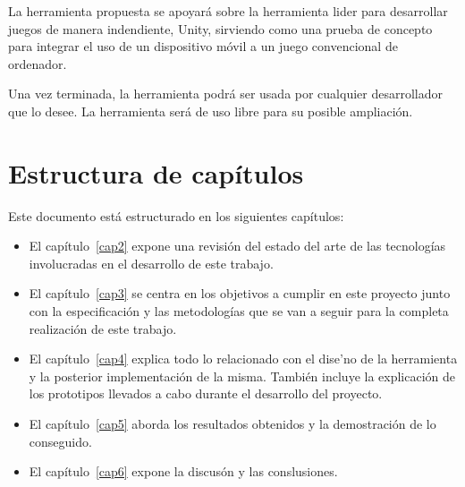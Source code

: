 La herramienta propuesta se apoyar\'a sobre la herramienta lider para desarrollar juegos de manera indendiente, Unity, sirviendo como una prueba de concepto para integrar el uso de un dispositivo m\'ovil a un juego convencional de ordenador.

Una vez terminada,  la herramienta podr\'a ser usada por cualquier desarrollador que lo desee. La herramienta ser\'a de uso libre para su posible ampliaci\'on. 

\section{Estructura de cap\'itulos}
\label{cap1:sec:estructura}

Este documento est\'a estructurado en los siguientes cap\'itulos:

\begin{itemize}
\item El cap\'itulo~\ref{cap2} expone una revisi\'on del estado del arte de las tecnolog\'ias involucradas en el desarrollo de este trabajo.

\item El cap\'itulo~\ref{cap3} se centra en los objetivos a cumplir en este proyecto junto con la especificaci\'on y las metodolog\'ias que se van a seguir para la completa realizaci\'on de este trabajo.

\item El cap\'itulo~\ref{cap4} explica todo lo relacionado con el dise'no de la herramienta y la posterior implementaci\'on de la misma. Tambi\'en incluye la explicaci\'on de los prototipos llevados a cabo durante el desarrollo del proyecto.

\item El cap\'itulo~\ref{cap5} aborda los resultados obtenidos y la demostraci\'on de lo conseguido.

\item El cap\'itulo~\ref{cap6} expone la discus\'on y las conslusiones.
\end{itemize}




